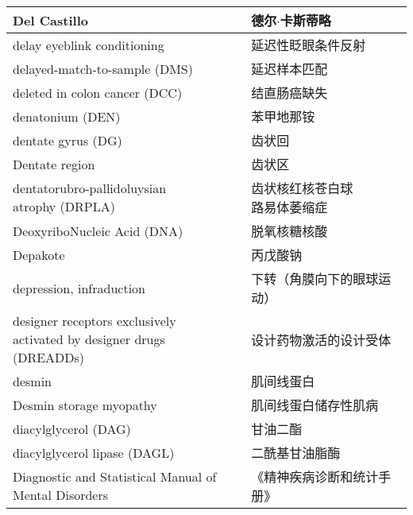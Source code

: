 \begin{longtable}{lll}
	\midrule
	Del Castillo   &&  德尔$\cdot$卡斯蒂略  \\
	
	\midrule
	delay eyeblink conditioning   &&  延迟性眨眼条件反射  \\
	
	\midrule
	delayed-match-to-sample  (DMS)   &&  延迟样本匹配  \\
	
	\midrule
	deleted in colon cancer (DCC)     &&  结直肠癌缺失  \\
	
	\midrule
	denatonium (DEN)   && 苯甲地那铵 \\
	
	\midrule
	dentate gyrus (DG)     && 齿状回 \\
	
	\midrule
	Dentate region     && 齿状区 \\
	
	\midrule
	\makecell[l]{dentatorubro-pallidoluysian\\ atrophy (DRPLA)}     &&  \makecell[l]{齿状核红核苍白球\\路易体萎缩症}  \\
	
	\midrule
	DeoxyriboNucleic Acid (DNA)     &&  脱氧核糖核酸  \\
	
	\midrule
	Depakote     &&  丙戊酸钠  \\
	
	\midrule
	depression, infraduction     &&  下转（角膜向下的眼球运动）  \\
	
	\midrule
	\makecell[l]{designer receptors exclusively\\ activated by designer drugs (DREADDs)}    &&  设计药物激活的设计受体  \\
	
	\midrule
	desmin   &&  肌间线蛋白  \\
	
	\midrule
	Desmin storage myopathy   &&  肌间线蛋白储存性肌病  \\
	
	\midrule
	diacylglycerol  (DAG)   &&  甘油二酯  \\
	
	\midrule
	diacylglycerol lipase  (DAGL)   &&  二酰基甘油脂酶  \\
	
	\midrule
	\makecell[l]{Diagnostic and Statistical Manual of \\Mental Disorders}     &&  《精神疾病诊断和统计手册》  \\
	

\end{longtable}
